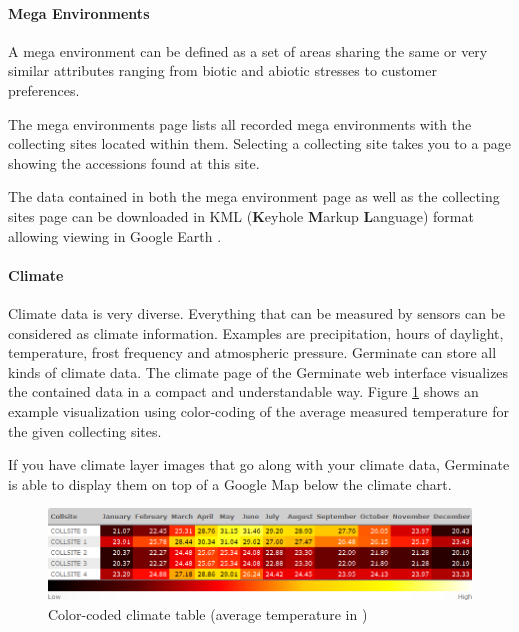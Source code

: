 \paragraph{Mega Environments}
A mega environment can be defined as a set of areas sharing the same or very similar attributes ranging from biotic and abiotic stresses to customer preferences.

The mega environments page lists all recorded mega environments with the collecting sites located within them. Selecting a collecting site takes you to a page showing the accessions found at this site.

The data contained in both the mega environment page as well as the collecting sites page can be downloaded in KML (\textbf{K}eyhole \textbf{M}arkup \textbf{L}anguage) format allowing viewing in Google Earth \cite{GoogleEarth}.

\paragraph{Climate}
Climate data is very diverse. Everything that can be measured by sensors can be considered as climate information. Examples are precipitation, hours of daylight, temperature, frost frequency and atmospheric pressure. Germinate can store all kinds of climate data. The climate page of the Germinate web interface visualizes the contained data in a compact and understandable way. Figure \ref{fig:climate_table} shows an example visualization using color-coding of the average measured temperature for the given collecting sites.

If you have climate layer images that go along with your climate data, Germinate is able to display them on top of a Google Map below the climate chart.

\begin{figure}
    \centering
    \includegraphics[scale=0.5]{img/features/climate_table.png}
    \caption{Color-coded climate table (average temperature in \textcelsius)}
    \label{fig:climate_table}
\end{figure}

